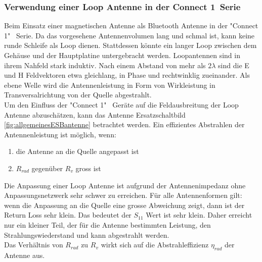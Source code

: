 \subsubsection{Verwendung einer Loop Antenne in der \glqq Connect 1\grqq \  Serie}
Beim Einsatz einer magnetischen Antenne als Bluetooth Antenne in der "Connect 1"  \ Serie. Da das vorgesehene Antennenvolumen lang und schmal ist, kann keine runde Schleife als Loop dienen. Stattdessen  könnte ein langer Loop zwischen dem Gehäuse und der Hauptplatine untergebracht werden. Loopantennen sind in ihrem Nahfeld stark induktiv. Nach einem Abstand von mehr als $2\lambda$ sind die E und H Feldvektoren etwa gleichlang, in Phase und rechtwinklig zueinander. Als ebene Welle wird die Antennenleistung in Form von Wirkleistung in Transversalrichtung von der Quelle abgestrahlt.\\
Um den Einfluss der "Connect 1" \ Geräte auf die Feldausbreitung der Loop Antenne abzuschätzen, kann das Antenne Ersatzschaltbild \ref{fig:allgemeinesESBantenne}  betrachtet werden. Ein effizientes Abstrahlen der Antennenleistung ist möglich, wenn:
  \begin{enumerate}[label={\alph*)}] 
     \item die Antenne an die Quelle angepasst ist 
     \item $R_{rad}$ gegenüber $R_{v}$ gross ist 
  \end{enumerate} 
  
Die Anpassung einer Loop Antenne ist aufgrund der Antennenimpedanz ohne Anpassungsnetzwerk sehr schwer zu erreichen. Für alle Antennenformen gilt: wenn die Anpassung an die Quelle eine grosse Abweichung zeigt, dann ist der Return Loss sehr klein. Das bedeutet der $S_{11}$ Wert ist sehr klein. Daher erreicht nur ein kleiner Teil, der für die Antenne bestimmten Leistung, den Strahlungswiederstand und kann abgestrahlt werden.\\
Das Verhältnis von $R_{rad}$ zu $R_{v}$ wirkt sich auf die Abstrahleffizienz $\eta_{rad}$ der Antenne aus. 




